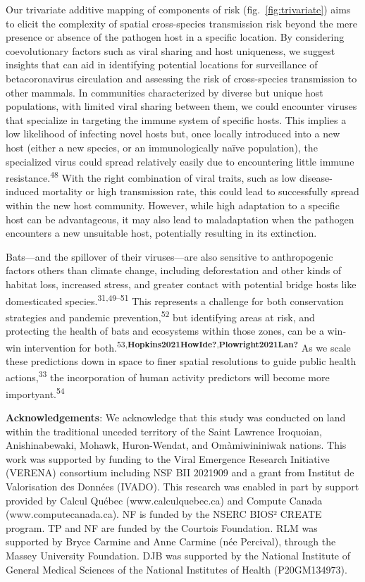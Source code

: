 \documentclass[10pt,oneside]{article}
\begin{document}
Our trivariate additive mapping of components of risk
(fig.~\ref{fig:trivariate}) aims to elicit the complexity of spatial
cross-species transmission risk beyond the mere presence or absence of
the pathogen host in a specific location. By considering coevolutionary
factors such as viral sharing and host uniqueness, we suggest insights
that can aid in identifying potential locations for surveillance of
betacoronavirus circulation and assessing the risk of cross-species
transmission to other mammals. In communities characterized by diverse
but unique host populations, with limited viral sharing between them, we
could encounter viruses that specialize in targeting the immune system
of specific hosts. This implies a low likelihood of infecting novel
hosts but, once locally introduced into a new host (either a new
species, or an immunologically naïve population), the specialized virus
could spread relatively easily due to encountering little immune
resistance.\textsuperscript{48} With the right combination of viral
traits, such as low disease-induced mortality or high transmission rate,
this could lead to successfully spread within the new host community.
However, while high adaptation to a specific host can be advantageous,
it may also lead to maladaptation when the pathogen encounters a new
unsuitable host, potentially resulting in its extinction.

Bats---and the spillover of their viruses---are also sensitive to
anthropogenic factors others than climate change, including
deforestation and other kinds of habitat loss, increased stress, and
greater contact with potential bridge hosts like domesticated
species.\textsuperscript{31,49--51} This represents a challenge for both
conservation strategies and pandemic prevention,\textsuperscript{52} but
identifying areas at risk, and protecting the health of bats and
ecosystems within those zones, can be a win-win intervention for
both.\textsuperscript{53,\textbf{Hopkins2021HowIde?},\textbf{Plowright2021Lan?}}
As we scale these predictions down in space to finer spatial resolutions
to guide public health actions,\textsuperscript{33} the incorporation of
human activity predictors will become more
importyant.\textsuperscript{54}

\textbf{Acknowledgements}: We acknowledge that this study was conducted
on land within the traditional unceded territory of the Saint Lawrence
Iroquoian, Anishinabewaki, Mohawk, Huron-Wendat, and Omàmiwininiwak
nations. This work was supported by funding to the Viral Emergence
Research Initiative (VERENA) consortium including NSF BII 2021909 and a
grant from Institut de Valorisation des Données (IVADO). This research
was enabled in part by support provided by Calcul Québec
(www.calculquebec.ca) and Compute Canada (www.computecanada.ca). NF is
funded by the NSERC BIOS² CREATE program. TP and NF are funded by the
Courtois Foundation. RLM was supported by Bryce Carmine and Anne Carmine
(née Percival), through the Massey University Foundation. DJB was
supported by the National Institute of General Medical Sciences of the
National Institutes of Health (P20GM134973).
\end{document}
